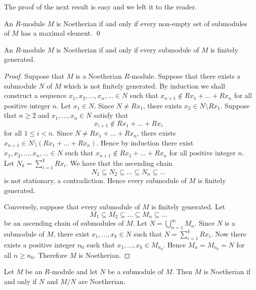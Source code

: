 The proof of the next result is easy and we left it to the reader.

\begin{proposition}\label{prop:Noetherian1}
An $R$-module $M$ is Noetherian if and only if every non-empty set of submodules of $M$ has a maximal element. \qed
\end{proposition}

\begin{proposition}\label{prop:Noetherian2}
    An $R$-module $M$ is Noetherian if and only if every submodule of $M$ is finitely generated.
\end{proposition}

\begin{proof}
Suppose that $M$ is a Noetherian $R$-module. Suppose that there exists a submodule $N$ of $M$ which is not finitely generated. By induction we shall construct a sequence $x_1,x_2,\dots ,x_n,\dots\in N$ such that
$x_{n+1}\notin Rx_1+\dots +Rx_n$ for all positive integer $n$. Let $x_1\in N$. Since $N\neq Rx_1$, there exists $x_2\in N\setminus Rx_1$. Suppose that $n\geq 2$ and $x_1,\dots ,x_n\in N$ satisfy that
\[ x_{i+1}\notin Rx_1+\dots +Rx_i\]
for all $1\leq i<n$. Since $N\neq Rx_1+\dots +Rx_n$, there exists $x_{n+1}\in N\setminus (Rx_1+\dots +Rx_n)$. Hence by induction there exist $x_1,x_2,\dots ,x_n,\dots \in N$ such that $x_{n+1}\notin Rx_1+\dots +Rx_n$ for all positive integer $n$. Let $N_k=\sum_{i=1}^kRx_i$. We have that the ascending chain
\[N_1\subseteq N_2\subseteq\dots\subseteq N_n\subseteq\dots\]
is not stationary, a contradiction. Hence every submodule of $M$ is finitely generated.

Conversely, suppose that every submodule of $M$ is finitely generated. Let
\[M_1\subseteq M_2\subseteq\dots\subseteq M_n\subseteq\dots\]
be an ascending chain of submodules of $M$. Let $N=\bigcup_{n=1}^{\infty}M_n$. Since $N$ is a submodule of $M$, there exist $x_1,\dots ,x_k\in N$ such that $N=\sum_{i=1}^kRx_i$. Now there exists a positive integer $n_0$ such that $x_1,\dots ,x_k\in M_{n_0}$. Hence $M_n=M_{n_0}=N$ for all $n\geq n_0$. Therefore $M$ is Noetherian.
\end{proof}

\begin{corollary}\label{cor:Noetherian3}
Let $M$ be an $R$-module and let $N$ be a submodule of $M$. Then $M$ is Noetherian if and only if $N$ and $M/N$ are Noetherian.
\end{corollary}

